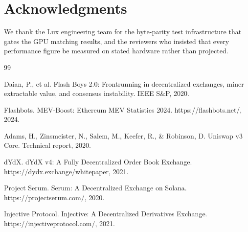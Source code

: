 \section*{Acknowledgments}


We thank the Lux engineering team for the byte-parity test infrastructure that gates the
GPU matching results, and the reviewers who insisted that every performance figure be
measured on stated hardware rather than projected.


\begin{thebibliography}{99}

Daian, P., et al. Flash Boys 2.0: Frontrunning in decentralized exchanges, miner extractable value, and consensus instability. IEEE S\&P, 2020.

Flashbots. MEV-Boost: Ethereum MEV Statistics 2024. https://flashbots.net/, 2024.

Adams, H., Zinsmeister, N., Salem, M., Keefer, R., \& Robinson, D. Uniswap v3 Core. Technical report, 2020.

dYdX. dYdX v4: A Fully Decentralized Order Book Exchange. https://dydx.exchange/whitepaper, 2021.

Project Serum. Serum: A Decentralized Exchange on Solana. https://projectserum.com/, 2020.

Injective Protocol. Injective: A Decentralized Derivatives Exchange. https://injectiveprotocol.com/, 2021.

\end{thebibliography}

